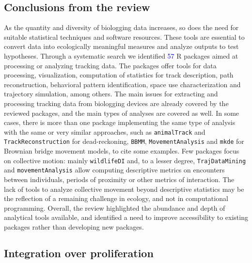 \documentclass[a4paper,12pt]{article}
\newcommand{\Rpkg}[1]{\texttt{#1}}
\begin{document}
\subsection*{Conclusions from the review}

As the quantity and diversity of biologging data increases, so does the need for suitable statistical techniques and software resources. These tools are essential to convert data into ecologically meaningful measures and analyze outputs to test hypotheses. Through a systematic search we identified \textcolor{blue}{57} R packages aimed at processing or analyzing tracking data. The packages offer tools for data processing, visualization, computation of statistics for track description, path reconstruction, behavioral pattern identification, space use characterization and trajectory simulation, among others. 
The main issues for extracting and processing tracking data from biologging devices are already covered by the reviewed packages, and the main types of analyses are covered as well. In some cases, there is more than one package implementing the same type of analysis with the same or very similar approaches, such as \Rpkg{animalTrack} and \Rpkg{TrackReconstruction} for dead-reckoning, \Rpkg{BBMM}, \Rpkg{MovementAnalysis} and \Rpkg{mkde} for Brownian bridge movement models, to cite some examples. Few packages focus on collective motion: mainly \Rpkg{wildlifeDI} and, to a lesser degree, \Rpkg{TrajDataMining} and \Rpkg{movementAnalysis} allow computing descriptive metrics on encounters between individuals, periods of proximity or other metrics of interaction. The lack of tools to analyze collective movement beyond descriptive statistics may be the reflection of a remaining challenge in ecology, and not in computational programming. 
Overall, the review highlighted the abundance and depth of analytical tools available, and identified a need to improve accessibility to existing packages rather than developing new packages.     

\subsection*{Integration over proliferation}
\end{document}
